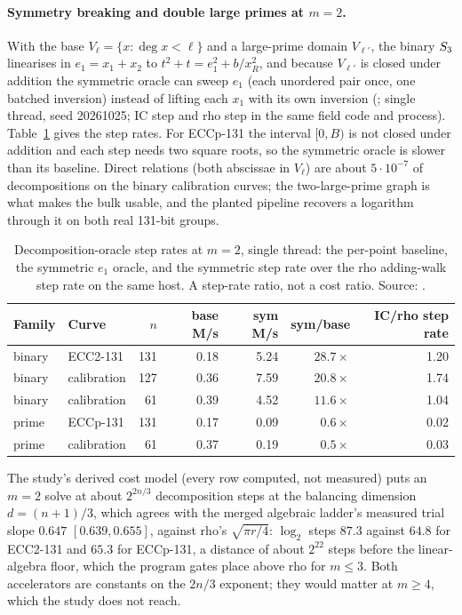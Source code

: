 \paragraph{Symmetry breaking and double large primes at $m=2$.} With the
base $V_\ell=\{x:\deg x<\ell\}$ and a large-prime domain $V_{\ell'}$, the
binary $S_{3}$ linearises in $e_1=x_1+x_2$ to $t^2+t=e_1^2+b/x_R^2$, and
because $V_{\ell'}$ is closed under addition the symmetric oracle can sweep
$e_1$ (each unordered pair once, one batched inversion) instead of lifting
each $x_1$ with its own inversion
(; single thread, seed
20261025; IC step and rho step in the same field code and process).
Table~\ref{tab:bt-symlp} gives the step rates. For ECCp-131 the interval
$[0,B)$ is not closed under addition and each step needs two square roots,
so the symmetric oracle is slower than its baseline. Direct relations (both
abscissae in $V_\ell$) are about $5\cdot10^{-7}$ of decompositions on the
binary calibration curves; the two-large-prime graph is what makes the bulk
usable, and the planted pipeline recovers a logarithm through it on both
real 131-bit groups.

\begin{table}[t]
\centering\small
\begin{tabular}{@{}llrrrrr@{}}
\toprule
Family & Curve & $n$ & base M/s & sym M/s & sym/base & IC/rho step rate \\
\midrule
binary & ECC2-131 & 131 & 0.18 & 5.24 & $28.7\times$ & 1.20 \\
binary & calibration & 127 & 0.36 & 7.59 & $20.8\times$ & 1.74 \\
binary & calibration & 61 & 0.39 & 4.52 & $11.6\times$ & 1.04 \\
prime & ECCp-131 & 131 & 0.17 & 0.09 & $0.6\times$ & 0.02 \\
prime & calibration & 61 & 0.37 & 0.19 & $0.5\times$ & 0.03 \\
\bottomrule
\end{tabular}
\caption[]{Decomposition-oracle step rates at $m=2$, single thread: the
per-point baseline, the symmetric $e_1$ oracle, and the symmetric step rate
over the rho adding-walk step rate on the same host. A step-rate ratio, not
a cost ratio. Source:
.}
\label{tab:bt-symlp}
\end{table}

The study's derived cost model (every row computed, not measured) puts an
$m=2$ solve at about $2^{2n/3}$ decomposition steps at the balancing
dimension $d=(n+1)/3$, which agrees with the merged algebraic ladder's
measured trial slope $0.647$ $[0.639,0.655]$, against rho's
$\sqrt{\pi r/4}$: $\log_2$ steps $87.3$ against $64.8$ for ECC2-131 and $65.3$
for ECCp-131, a distance of about $2^{22}$ steps before the linear-algebra
floor, which the program gates place above rho for $m\le3$. Both
accelerators are constants on the $2n/3$ exponent; they would matter at
$m\ge4$, which the study does not reach.

